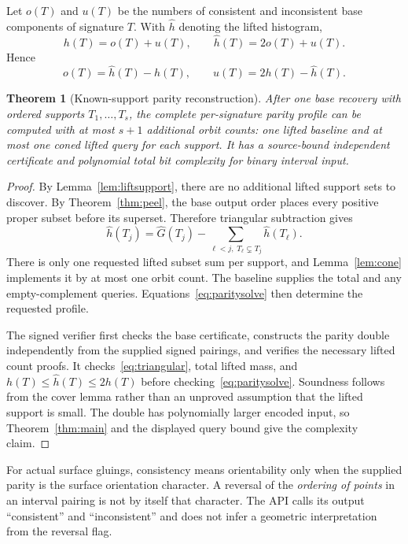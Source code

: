 \documentclass[11pt,letterpaper]{article}
\newtheorem{theorem}{Theorem}[section]
\theoremstyle{definition}\newtheorem{definition}[theorem]{Definition}
\theoremstyle{remark}\newtheorem{remark}[theorem]{Remark}
\begin{document}
Let $o(T)$ and $u(T)$ be the numbers of consistent and inconsistent base components of signature $T$. With $\widehat h$ denoting the lifted histogram,
\begin{equation}
h(T)=o(T)+u(T),\qquad \widehat h(T)=2o(T)+u(T).
\label{eq:paritycounts}
\end{equation}
Hence
\begin{equation}
o(T)=\widehat h(T)-h(T),\qquad
u(T)=2h(T)-\widehat h(T).
\label{eq:paritysolve}
\end{equation}

\begin{theorem}[Known-support parity reconstruction]
\label{thm:parity}
After one base recovery with ordered supports $T_1,\ldots,T_s$, the complete per-signature parity profile can be computed with at most $s+1$ additional orbit counts: one lifted baseline and at most one coned lifted query for each support. It has a source-bound independent certificate and polynomial total bit complexity for binary interval input.
\end{theorem}
\begin{proof}
By Lemma~\ref{lem:liftsupport}, there are no additional lifted support sets to discover. By Theorem~\ref{thm:peel}, the base output order places every positive proper subset before its superset. Therefore triangular subtraction gives
\begin{equation}
\widehat h(T_j)=\widehat G(T_j)
 -\sum_{\ell<j,\;T_\ell\subsetneq T_j}\widehat h(T_\ell).
\label{eq:triangular}
\end{equation}
There is only one requested lifted subset sum per support, and Lemma~\ref{lem:cone} implements it by at most one orbit count. The baseline supplies the total and any empty-complement queries. Equations~\eqref{eq:paritysolve} then determine the requested profile.

The signed verifier first checks the base certificate, constructs the parity double independently from the supplied signed pairings, and verifies the necessary lifted count proofs. It checks~\eqref{eq:triangular}, total lifted mass, and
$h(T)\le\widehat h(T)\le2h(T)$ before checking~\eqref{eq:paritysolve}. Soundness follows from the cover lemma rather than an unproved assumption that the lifted support is small. The double has polynomially larger encoded input, so Theorem~\ref{thm:main} and the displayed query bound give the complexity claim.
\end{proof}

For actual surface gluings, consistency means orientability only when the supplied parity is the surface orientation character. A reversal of the \emph{ordering of points} in an interval pairing is not by itself that character. The API calls its output ``consistent'' and ``inconsistent'' and does not infer a geometric interpretation from the reversal flag.
\end{document}
